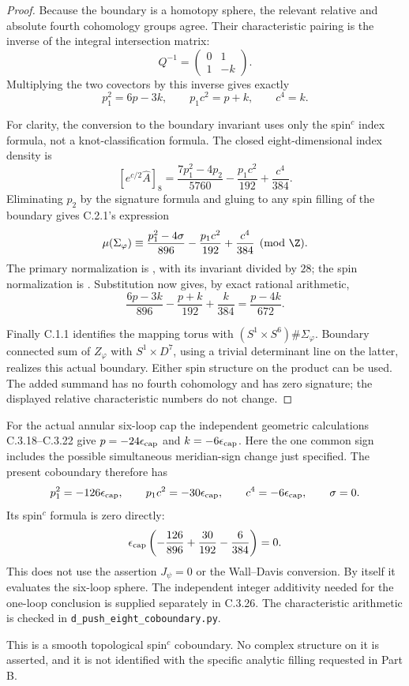 \begin{proof}
Because the boundary is a homotopy sphere, the relevant relative
and absolute fourth cohomology groups agree. Their characteristic
pairing is the inverse of the integral intersection matrix:
\[
 Q^{-1}=\begin{pmatrix}0&1\\1&-k\end{pmatrix}.
\]
Multiplying the two covectors by this inverse gives exactly
\[
 p_1^2=6p-3k,\qquad p_1c^2=p+k,\qquad c^4=k.
\]

For clarity, the conversion to the boundary invariant uses only
the spin$^c$ index formula, not a knot-classification formula.
The closed eight-dimensional index density is
\[
 [e^{c/2}\widehat A]_8
 =\frac{7p_1^2-4p_2}{5760}
       -\frac{p_1c^2}{192}+\frac{c^4}{384}.
\]
Eliminating $p_2$ by the signature formula and gluing to any spin
filling of the boundary gives C.2.1's expression
\[
 \mu(\Sigma_\varphi)\equiv
 \frac{p_1^2-4\sigma}{896}
 -\frac{p_1c^2}{192}+\frac{c^4}{384}\pmod\Z.
\]
The primary normalization is
\citet[Section 2.2, equation (2.1)]{CrowleyNordstrom2020},
with its invariant divided by $28$; the spin normalization is
\citet[Section 6, equation (11)]{EellsKuiper1962}.
Substitution now gives, by exact rational arithmetic,
\[
 \frac{6p-3k}{896}-\frac{p+k}{192}+\frac{k}{384}
       =\frac{p-4k}{672}.
\]

Finally C.1.1 identifies the mapping torus with
$(S^1\times S^6)\#\Sigma_\varphi$. Boundary connected sum
of $Z_\varphi$ with $S^1\times D^7$, using a trivial determinant
line on the latter, realizes this actual boundary. Either spin
structure on the product can be used. The added summand has no
fourth cohomology and has zero signature; the displayed relative
characteristic numbers do not change.
\end{proof}

\begin{remark}
For the actual annular six-loop cap the independent geometric
calculations C.3.18--C.3.22 give
$p=-24\epsilon_{\rm cap}$ and $k=-6\epsilon_{\rm cap}$.
Here the one common sign includes the possible simultaneous
meridian-sign change just specified.
The present coboundary therefore has
\[
 p_1^2=-126\epsilon_{\rm cap},\qquad
 p_1c^2=-30\epsilon_{\rm cap},\qquad
 c^4=-6\epsilon_{\rm cap},\qquad \sigma=0.
\]
Its spin$^c$ formula is zero directly:
\[
 \epsilon_{\rm cap}
 \left(-\frac{126}{896}+\frac{30}{192}
                         -\frac{6}{384}\right)=0.
\]
This does not use the assertion $J_\psi=0$ or the Wall--Davis
conversion. By itself it evaluates the six-loop sphere. The
independent integer additivity needed for the one-loop conclusion
is supplied separately in C.3.26. The characteristic arithmetic
is checked in \texttt{d\_push\_eight\_coboundary.py}.

This is a smooth topological spin$^c$ coboundary. No complex
structure on it is asserted, and it is not identified with the
specific analytic filling requested in Part B.
\end{remark}

